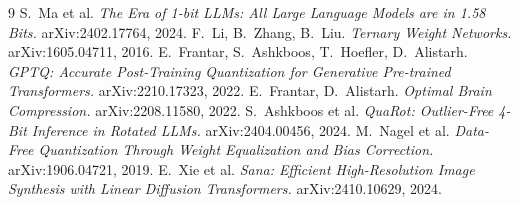 \documentclass[11pt]{article}
\begin{document}
\begin{thebibliography}{9}
 S.~Ma et al. \emph{The Era of 1-bit LLMs: All Large Language
Models are in 1.58 Bits.} arXiv:2402.17764, 2024.
 F.~Li, B.~Zhang, B.~Liu. \emph{Ternary Weight Networks.}
arXiv:1605.04711, 2016.
 E.~Frantar, S.~Ashkboos, T.~Hoefler, D.~Alistarh. \emph{GPTQ:
Accurate Post-Training Quantization for Generative Pre-trained Transformers.}
arXiv:2210.17323, 2022.
 E.~Frantar, D.~Alistarh. \emph{Optimal Brain Compression.}
arXiv:2208.11580, 2022.
 S.~Ashkboos et al. \emph{QuaRot: Outlier-Free 4-Bit Inference in
Rotated LLMs.} arXiv:2404.00456, 2024.
 M.~Nagel et al. \emph{Data-Free Quantization Through Weight
Equalization and Bias Correction.} arXiv:1906.04721, 2019.
 E.~Xie et al. \emph{Sana: Efficient High-Resolution Image Synthesis
with Linear Diffusion Transformers.} arXiv:2410.10629, 2024.
\end{thebibliography}
\end{document}
